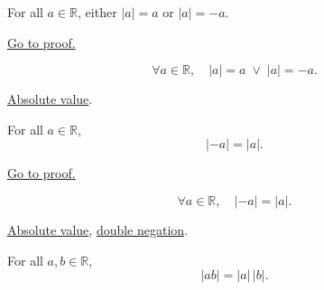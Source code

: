 \begin{theorem}
\label{thm:absolute-value-self-or-neg}
For all $a \in \mathbb{R}$, either $\lvert a \rvert = a$ or
$\lvert a \rvert = -a$.
\end{theorem}



\begin{remark*}[Proof]
\hyperref[prf:absolute-value-self-or-neg]{Go to proof.}
\end{remark*}

\begin{remark*}
\[
  \forall a \in \mathbb{R},\quad
  \lvert a \rvert = a \;\lor\; \lvert a \rvert = -a.
\]
\end{remark*}

\begin{dependencies}
\hyperref[def:absolute-value]{Absolute value}.
\end{dependencies}


\begin{theorem}
\label{thm:absolute-value-symmetric}
For all $a \in \mathbb{R}$,
\[
  \lvert -a \rvert = \lvert a \rvert.
\]
\end{theorem}



\begin{remark*}[Proof]
\hyperref[prf:absolute-value-symmetric]{Go to proof.}
\end{remark*}

\begin{remark*}
\[
  \forall a \in \mathbb{R},\quad \lvert -a \rvert = \lvert a \rvert.
\]
\end{remark*}

\begin{dependencies}
\hyperref[def:absolute-value]{Absolute value},
\hyperref[thm:ring-double-negation]{double negation}.
\end{dependencies}


\begin{theorem}
\label{thm:absolute-value-product}
For all $a, b \in \mathbb{R}$,
\[
  \lvert ab \rvert = \lvert a \rvert\,\lvert b \rvert.
\]
\end{theorem}



